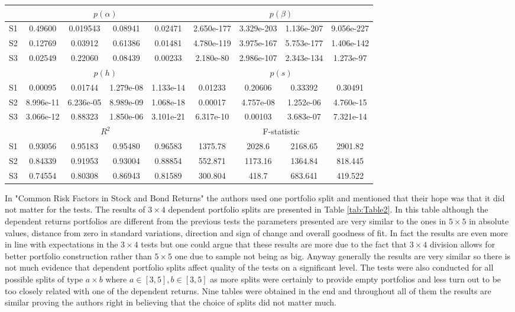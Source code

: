\documentclass[a4paper,12pt]{article} %
\begin{document}
\begin{table}
\begin{longtable}{c|cccc|cccc|}
		& \multicolumn{4}{c|}{$p(\alpha)$} & \multicolumn{4}{c|}{$p(\beta)$}\\
		\hline
		S1& 0.49600 &  0.019543 &  0.08941 &   0.02471 &  2.650e-177 &  3.329e-203 &  1.136e-207 &  9.056e-227\\
		S2& 0.12769 &  0.03912 &   0.61386 &   0.01481 &  4.780e-119 &  3.975e-167 &  5.753e-177 &  1.406e-142\\
		S3& 0.02549 &   0.22060 &  0.08439 &  0.00233 &   2.180e-80 &  2.986e-107 &  2.343e-134 &   1.273e-97
		\vspace{0.3cm}\\
		& \multicolumn{4}{c|}{$p(h)$} & \multicolumn{4}{c|}{$p(s)$}\\
		\hline
		S1& 0.00095 &    0.01744 &  1.279e-08 &  1.133e-14 &    0.01233 &     0.20606 &      0.33392 &     0.30491\\
		S2& 8.996e-11 &  6.236e-05 &  8.989e-09 &  1.068e-18 &  0.00017 &  4.757e-08 &  1.252e-06 &  4.760e-15\\
		S3& 3.066e-12 &     0.88323 &  1.850e-06 &  3.101e-21 &   6.317e-10 &   0.00103 &  3.683e-07 &   7.321e-14
		\vspace{0.3cm}\\
		& \multicolumn{4}{c|}{$R^2$} & \multicolumn{4}{c|}{F-statistic}\\
		\hline
		S1& 0.93056 &  0.95183 &  0.95480 &  0.96583 &  1375.78 &   2028.6 &  2168.65 &  2901.82\\
		S2& 0.84339 &  0.91953 &   0.93004 &   0.88854 &  552.871 &  1173.16 &  1364.84 &  818.445\\
		S3& 0.74554 &  0.80308 &  0.86943 &  0.81589 &  300.804 &    418.7 &  683.641 &  419.522
	\end{longtable}%
\end{table}
In "Common Risk Factors in Stock and Bond Returns" the authors used one portfolio split and mentioned that their hope was that it did not matter for the tests. The results of $3\times 4$ dependent portfolio splits are presented in Table \ref{tab:Table2}. In this table although the dependent returns portfolios are different from the previous tests the parameters presented are very similar to the ones in $5\times 5$ in absolute values, distance from zero in standard variations, direction and sign of change and overall goodness of fit. In fact the results are even more in line with expectations in the $3\times 4$ tests but one could argue that these results are more due to the fact that $3\times 4$ division allows for better portfolio construction rather than $5\times 5$ one due to sample not being as big. Anyway generally the results are very similar so there is not much evidence that dependent portfolio splits affect quality of the tests on a significant level. The tests were also conducted for all possible splits of type $a \times b$ where $a \in [3, 5], b \in [3, 5]$ as more splits were certainly to provide empty portfolios and less turn out to be too closely related with one of the dependent returns. Nine tables were obtained in the end and throughout all of them the results are similar proving the authors right in believing that the choice of splits did not matter much. 
\newpage
\end{document}
